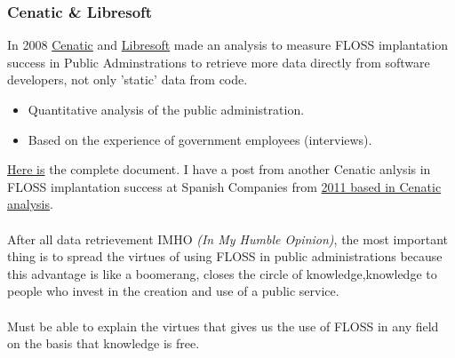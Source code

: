 \subsubsection{ Cenatic \& Libresoft} In 2008 \href{http://www.cenatic.es/sobre-cenatic}{Cenatic} and \href{http://libresoft.es/about}{Libresoft} made an analysis to measure FLOSS implantation success in Public Adminstrations to retrieve more data directly from software developers, not only 'static' data from code.
\begin{itemize}
	\item Quantitative analysis of the public administration.
	\item Based on the experience of government employees (interviews).
\end{itemize}\href{http://observatorio.cenatic.es/index.php?option=com_content&amp;view=article&amp;id=39:software-de-fuentes-abiertas-para-el-desarrollo-de-la-administracion-publica-espanola-una-vision-global-2008&amp;catid=5:administraciones-publicas&amp;Itemid=21}{Here is} the complete document. I have a post from another Cenatic anlysis in FLOSS implantation success at Spanish Companies from \href{http://mastersfwlurjc.blogspot.com.es/2013/01/el-uso-del-software-libre-en-las.html}{2011 based in Cenatic analysis}.
\\
\\ After all data retrievement IMHO \textit{(In My Humble Opinion)}, the most important thing is to spread the virtues of using FLOSS in public administrations because this advantage is like a boomerang, closes the circle of knowledge,\nolinebreakreturning knowledge to people who invest in the creation and use of a public service.
\\
\\ Must be able to explain the virtues that gives us the use of FLOSS in any field on the basis that knowledge is free.